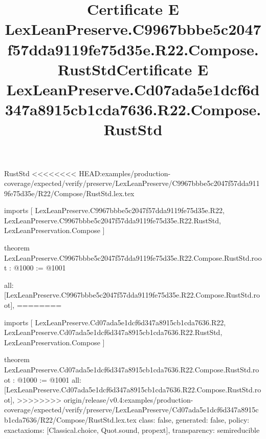 \begin{lexlean}{RustStd}
<<<<<<<< HEAD:examples/production-coverage/expected/verify/preserve/LexLeanPreserve/C9967bbbe5c2047f57dda9119fe75d35e/R22/Compose/RustStd.lex.tex
\title{Certificate E LexLeanPreserve.C9967bbbe5c2047f57dda9119fe75d35e.R22.Compose.RustStd}
\begin{coremodule}
imports [
  LexLeanPreserve.C9967bbbe5c2047f57dda9119fe75d35e.R22,
  LexLeanPreserve.C9967bbbe5c2047f57dda9119fe75d35e.R22.RustStd,
  LexLeanPreservation.Compose
]

theorem LexLeanPreserve.C9967bbbe5c2047f57dda9119fe75d35e.R22.Compose.RustStd.root : @1000 := @1001 {
  all: [LexLeanPreserve.C9967bbbe5c2047f57dda9119fe75d35e.R22.Compose.RustStd.root],
========
\title{Certificate E LexLeanPreserve.Cd07ada5e1dcf6d347a8915cb1cda7636.R22.Compose.RustStd}
\begin{coremodule}
imports [
  LexLeanPreserve.Cd07ada5e1dcf6d347a8915cb1cda7636.R22,
  LexLeanPreserve.Cd07ada5e1dcf6d347a8915cb1cda7636.R22.RustStd,
  LexLeanPreservation.Compose
]

theorem LexLeanPreserve.Cd07ada5e1dcf6d347a8915cb1cda7636.R22.Compose.RustStd.root : @1000 := @1001 {
  all: [LexLeanPreserve.Cd07ada5e1dcf6d347a8915cb1cda7636.R22.Compose.RustStd.root],
>>>>>>>> origin/release/v0.4:examples/production-coverage/expected/verify/preserve/LexLeanPreserve/Cd07ada5e1dcf6d347a8915cb1cda7636/R22/Compose/RustStd.lex.tex
  class: false,
  generated: false,
  policy: exact{axioms: [Classical.choice, Quot.sound, propext]},
  transparency: semireducible
}


\end{coremodule}}
\end{coremodule}
\end{lexlean}
